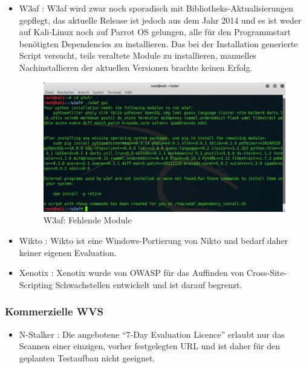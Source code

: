 \documentclass[12pt,oneside,a4paper,parskip]{scrbook}
\begin{document}
\begin{itemize}
      \item W3af \cite{W3af}: W3af wird zwar noch sporadisch mit Bibliotheks-Aktualisierungen gepflegt, das aktuelle Release ist jedoch aus dem Jahr 2014 und es ist weder auf Kali-Linux noch auf Parrot OS gelungen, alle für den Programmstart benötigten Dependencies zu installieren. Das bei der Installation generierte Script versucht, teils veraltete Module zu installieren, manuelles Nachinstallieren der aktuellen Versionen brachte keinen Erfolg.
      \begin{figure}[H]
        \includegraphics[width=1\textwidth]{Images/w3af}
        \caption[W3af: Fehlende Module]{W3af: Fehlende Module}
      \end{figure}
      \item Wikto \cite{Wikto}: Wikto ist eine Windows-Portierung von Nikto und bedarf daher keiner eigenen Evaluation.
      \item Xenotix \cite{Xenotix}: Xenotix wurde von OWASP für das Auffinden von Cross-Site-Scripting Schwachstellen entwickelt und ist darauf begrenzt.
    \end{itemize}
    \subsubsection{Kommerzielle WVS}
      \begin{itemize}
        \item N-Stalker \cite{Stalker}: Die angebotene ``7-Day Evaluation Licence'' erlaubt nur das Scannen einer einzigen, vorher festgelegten URL und ist daher für den geplanten Testaufbau nicht geeignet.
      \end{itemize}
\end{document}
